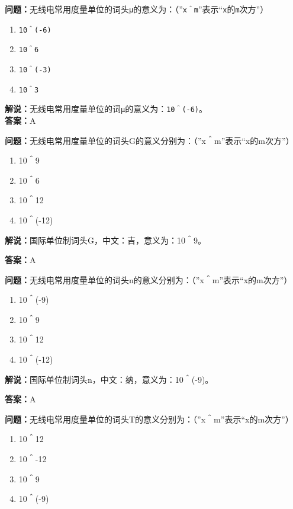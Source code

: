 \textbf{问题：}无线电常用度量单位的词头\texttt{μ}的意义为：（”\texttt{x＾m}”表示“\texttt{x}的\texttt{m}次方”）

\begin{enumerate}[label=\Alph*), leftmargin=1cm]
	\item \texttt{10＾(-6)}
	\item \texttt{10＾6}
	\item \texttt{10＾(-3)}
	\item \texttt{10＾3}
\end{enumerate}

\textbf{解说：}无线电常用度量单位的词\texttt{μ}的意义为：\texttt{10＾(-6)}。\\\textbf{答案：}A



\textbf{问题：}无线电常用度量单位的词头G的意义分别为：（”x＾m”表示“x的m次方”）

\begin{enumerate}[label=\Alph*), leftmargin=1cm]
	\item 10＾9
	\item 10＾6
	\item 10＾12
	\item 10＾(-12)
\end{enumerate}

\textbf{解说：}国际单位制词头G，中文：吉，意义为：10＾9。

\textbf{答案：}A

\textbf{问题：}无线电常用度量单位的词头n的意义分别为：（”x＾m”表示“x的m次方”）

\begin{enumerate}[label=\Alph*), leftmargin=1cm]
	\item 10＾(-9)
	\item 10＾9
	\item 10＾12
	\item 10＾(-12)
\end{enumerate}

\textbf{解说：}国际单位制词头n，中文：纳，意义为：10＾(-9)。

\textbf{答案：}A

\textbf{问题：}无线电常用度量单位的词头T的意义分别为：（”x＾m”表示“x的m次方”）

\begin{enumerate}[label=\Alph*), leftmargin=1cm]
	\item 10＾12
	\item 10＾-12
	\item 10＾9
	\item 10＾(-9)
\end{enumerate}

